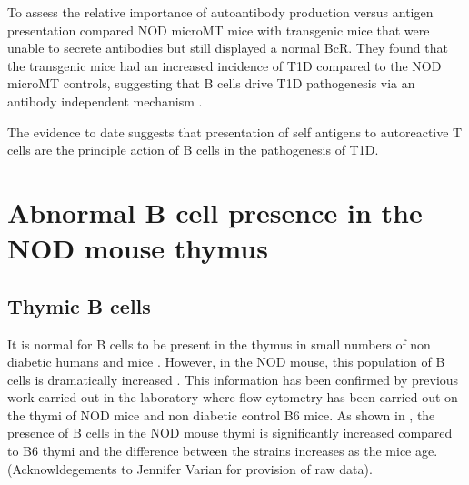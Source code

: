 To assess the relative importance of autoantibody production versus antigen presentation \citet{Wong2004} compared NOD microMT mice with transgenic mice that were unable to secrete antibodies but still displayed a normal BcR.
They found that the transgenic mice had an increased incidence of T1D compared to the NOD microMT controls, suggesting that B cells drive T1D pathogenesis via an antibody independent mechanism \citep{Wong2004}.

The evidence to date suggests that presentation of self antigens to autoreactive T cells are the principle action of B cells in the pathogenesis of T1D.





\subsection{}

\section{Abnormal B cell presence in the NOD mouse thymus}
\subsection{Thymic B cells}



It is normal for B cells to be present in the thymus in small numbers \citep{Isaacson1987, Akashi2000} of non diabetic humans \citep{Isaacson1987} and mice \citep{Akashi2000}. 
However, in the NOD mouse, this population of B cells is dramatically increased \citep{OReilly1994}.
This information has been confirmed by previous work carried out in the laboratory where flow cytometry has been carried out on the thymi of NOD mice and non diabetic control B6 mice.
As shown in , the presence of B cells in the NOD mouse thymi is significantly increased compared to B6 thymi and the difference between the strains increases as the mice age. (Acknowldegements to Jennifer Varian for provision of raw data). 

